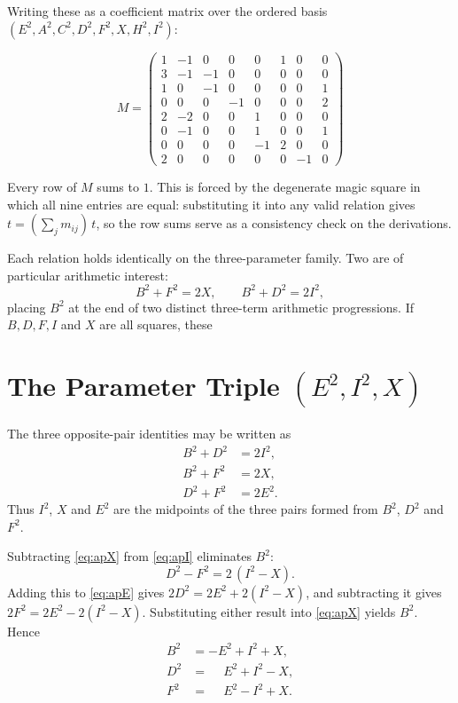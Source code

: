 \documentclass[12pt]{article}
\begin{document}
Writing these as a coefficient matrix over the ordered basis
$(E^2, A^2, C^2, D^2, F^2, X, H^2, I^2)$:

\[
M =
\begin{pmatrix}
1 & -1 &  0 &  0 &  0 & 1 &  0 & 0 \\
3 & -1 & -1 &  0 &  0 & 0 &  0 & 0 \\
1 &  0 & -1 &  0 &  0 & 0 &  0 & 1 \\
0 &  0 &  0 & -1 &  0 & 0 &  0 & 2 \\
2 & -2 &  0 &  0 &  1 & 0 &  0 & 0 \\
0 & -1 &  0 &  0 &  1 & 0 &  0 & 1 \\
0 &  0 &  0 &  0 & -1 & 2 &  0 & 0 \\
2 &  0 &  0 &  0 &  0 & 0 & -1 & 0
\end{pmatrix}
\]

Every row of $M$ sums to $1$. This is forced by the degenerate
magic square in which all nine entries are equal: substituting it
into any valid relation gives $t = (\textstyle\sum_j m_{ij})\,t$,
so the row sums serve as a consistency check on the derivations.

Each relation holds identically on the three-parameter family.
Two are of particular arithmetic interest:
\[
B^2 + F^2 = 2X, \qquad B^2 + D^2 = 2I^2,
\]
placing $B^2$ at the end of two distinct three-term arithmetic
progressions. If $B, D, F, I$ and $X$ are all squares, these

\section{The Parameter Triple $(E^2, I^2, X)$}

The three opposite-pair identities may be written as
\begin{align}
B^2 + D^2 &= 2I^2, \label{eq:apI}\\
B^2 + F^2 &= 2X,   \label{eq:apX}\\
D^2 + F^2 &= 2E^2. \label{eq:apE}
\end{align}
Thus $I^2$, $X$ and $E^2$ are the midpoints of the three pairs
formed from $B^2$, $D^2$ and $F^2$.

Subtracting \eqref{eq:apX} from \eqref{eq:apI} eliminates $B^2$:
\[
D^2 - F^2 = 2\,(I^2 - X). \label{eq:diff}
\]
Adding this to \eqref{eq:apE} gives $2D^2 = 2E^2 + 2(I^2 - X)$,
and subtracting it gives $2F^2 = 2E^2 - 2(I^2 - X)$. Substituting
either result into \eqref{eq:apX} yields $B^2$. Hence
\begin{align}
B^2 &= -E^2 + I^2 + X, \\
D^2 &= \phantom{-}E^2 + I^2 - X, \\
F^2 &= \phantom{-}E^2 - I^2 + X.
\end{align}
\end{document}

